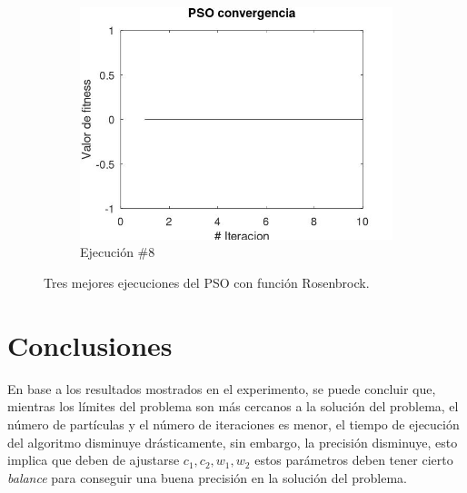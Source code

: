 \documentclass[12pt, a4paper]{article}
\begin{document}
\begin{figure}[H]
             \hfill
             \begin{subfigure}[b]{0.3\textwidth}
                 \centering
                 \includegraphics[width=\textwidth]{img/pso8.jpg}
                 \caption{Ejecución \#8}
                 \label{fig:pso8}
             \end{subfigure}
                \caption{Tres mejores ejecuciones del PSO con función Rosenbrock.}
                \label{fig:psobest3}
        \end{figure}
        
    \section{Conclusiones}
        En base a los resultados mostrados en el experimento, se puede concluir que, mientras los límites del problema son más cercanos a la solución del problema, el número de partículas y el número de iteraciones es menor, el tiempo de ejecución del algoritmo disminuye drásticamente, sin embargo, la precisión disminuye, esto implica que deben de ajustarse \(c_1, c_2, w_1, w_2\) estos parámetros deben tener cierto \emph{balance} para conseguir una buena precisión en la solución del problema.

    
    
    \nocite{*}
    
\end{document}
